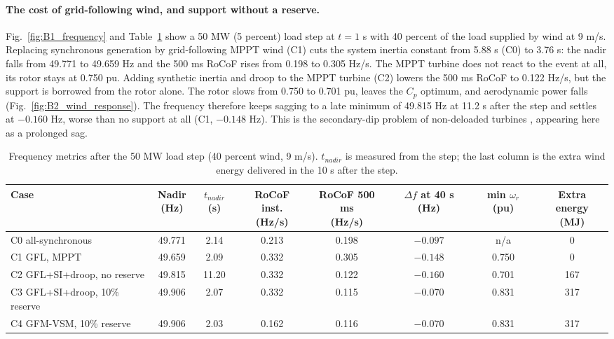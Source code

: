 \paragraph{The cost of grid-following wind, and support without a reserve.} Fig.~\ref{fig:B1_frequency} and Table~\ref{tab:B} show a 50 MW (5 percent) load step at $t=1$ s with 40 percent of the load supplied by wind at 9 m/s. Replacing synchronous generation by grid-following MPPT wind (C1) cuts the system inertia constant from 5.88 s (C0) to 3.76 s: the nadir falls from 49.771 to 49.659 Hz and the 500 ms RoCoF rises from 0.198 to 0.305 Hz/s. The MPPT turbine does not react to the event at all, its rotor stays at 0.750 pu. Adding synthetic inertia and droop to the MPPT turbine (C2) lowers the 500 ms RoCoF to 0.122 Hz/s, but the support is borrowed from the rotor alone. The rotor slows from 0.750 to 0.701 pu, leaves the $C_p$ optimum, and aerodynamic power falls (Fig.~\ref{fig:B2_wind_response}). The frequency therefore keeps sagging to a late minimum of 49.815 Hz at 11.2 s after the step and settles at $-0.160$ Hz, worse than no support at all (C1, $-0.148$ Hz). This is the secondary-dip problem of non-deloaded turbines \cite{ullah}, appearing here as a prolonged sag.

\begin{table}[H]\centering\small\setlength{\tabcolsep}{4pt}
\caption{Frequency metrics after the 50 MW load step (40 percent wind, 9 m/s). $t_{nadir}$ is measured from the step; the last column is the extra wind energy delivered in the 10 s after the step.}\label{tab:B}
\begin{tabular}{@{}lccccccc@{}}\toprule
Case & \shortstack{Nadir\\(Hz)} & \shortstack{$t_{nadir}$\\(s)} & \shortstack{RoCoF inst.\\(Hz/s)} & \shortstack{RoCoF 500 ms\\(Hz/s)} & \shortstack{$\Delta f$ at 40 s\\(Hz)} & \shortstack{min $\omega_r$\\(pu)} & \shortstack{Extra energy\\(MJ)}\\\midrule
C0 all-synchronous & 49.771 & 2.14 & 0.213 & 0.198 & $-0.097$ & n/a & 0\\
C1 GFL, MPPT & 49.659 & 2.09 & 0.332 & 0.305 & $-0.148$ & 0.750 & 0\\
C2 GFL+SI+droop, no reserve & 49.815 & 11.20 & 0.332 & 0.122 & $-0.160$ & 0.701 & 167\\
C3 GFL+SI+droop, 10\% reserve & 49.906 & 2.07 & 0.332 & 0.115 & $-0.070$ & 0.831 & 317\\
C4 GFM-VSM, 10\% reserve & 49.906 & 2.03 & 0.162 & 0.116 & $-0.070$ & 0.831 & 317\\\bottomrule
\end{tabular}\end{table}

